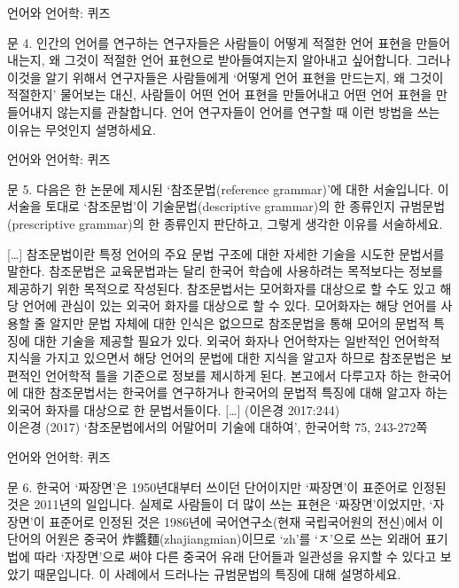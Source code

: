 \documentclass[11pt, aspectratio=169]{beamer}
\begin{document}
\begin{frame}[t]{언어와 언어학: 퀴즈}
  \begin{block}{문 4.}
    인간의 언어를 연구하는 연구자들은 사람들이 어떻게 적절한 언어 표현을 만들어내는지, 왜 그것이 적절한 언어 표현으로 받아들여지는지 알아내고 싶어합니다. 그러나 이것을 알기 위해서 연구자들은 사람들에게 ‘어떻게 언어 표현을 만드는지, 왜 그것이 적절한지’ 물어보는 대신, 사람들이 어떤 언어 표현을 만들어내고 어떤 언어 표현을 만들어내지 않는지를 관찰합니다. 언어 연구자들이 언어를 연구할 때 이런 방법을 쓰는 이유는 무엇인지 설명하세요. 
  \end{block}
\end{frame}

\begin{frame}[t]{언어와 언어학: 퀴즈}
  \begin{block}{문 5.}
    다음은 한 논문에 제시된 ‘참조문법(reference grammar)’에 대한 서술입니다. 이 서술을 토대로 ‘참조문법’이 기술문법(descriptive grammar)의 한 종류인지 규범문법(prescriptive grammar)의 한 종류인지 판단하고, 그렇게 생각한 이유를 서술하세요. 
  \end{block}
  {\scriptsize […] 참조문법이란 특정 언어의 주요 문법 구조에 대한 자세한 기술을 시도한 문법서를 말한다. 참조문법은 교육문법과는 달리 한국어 학습에 사용하려는 목적보다는 정보를 제공하기 위한 목적으로 작성된다. 참조문법서는 모어화자를 대상으로 할 수도 있고 해당 언어에 관심이 있는 외국어 화자를 대상으로 할 수 있다. 모어화자는 해당 언어를 사용할 줄 알지만 문법 자체에 대한 인식은 없으므로 참조문법을 통해 모어의 문법적 특징에 대한 기술을 제공할 필요가 있다. 외국어 화자나 언어학자는 일반적인 언어학적 지식을 가지고 있으면서 해당 언어의 문법에 대한 지식을 알고자 하므로 참조문법은 보편적인 언어학적 틀을 기준으로 정보를 제시하게 된다. 본고에서 다루고자 하는 한국어에 대한 참조문법서는 한국어를 연구하거나 한국어의 문법적 특징에 대해 알고자 하는 외국어 화자를 대상으로 한 문법서들이다. […] (이은경 2017:244)\\
  이은경 (2017) ‘참조문법에서의 어말어미 기술에 대하여’, 한국어학 75, 243-272쪽}
\end{frame}

\begin{frame}[t]{언어와 언어학: 퀴즈}
  \begin{block}{문 6.}
    한국어 ‘짜장면’은 1950년대부터 쓰이던 단어이지만 ‘짜장면’이 표준어로 인정된 것은 2011년의 일입니다. 실제로 사람들이 더 많이 쓰는 표현은 ‘짜장면’이었지만, ‘자장면’이 표준어로 인정된 것은 1986년에 국어연구소(현재 국립국어원의 전신)에서 이 단어의 어원은 중국어 炸醬麵(zhajiangmian)이므로 ‘zh'를 ‘ㅈ’으로 쓰는 외래어 표기법에 따라 ‘자장면’으로 써야 다른 중국어 유래 단어들과 일관성을 유지할 수 있다고 보았기 때문입니다. 이 사례에서 드러나는 규범문법의 특징에 대해 설명하세요. 
  \end{block}
\end{frame}
\end{document}
